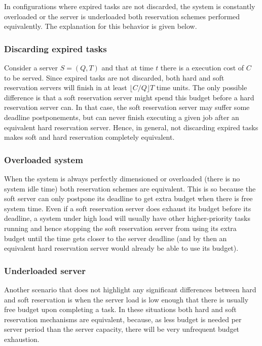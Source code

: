 \documentclass[times, 10pt,twocolumn]{article}
\begin{document}
\label{sec:noDifference}

In configurations where expired tasks are not discarded, the system is
constantly overloaded or the server is underloaded both
reservation schemes performed equivalently. The explanation for this
behavior is given below.

\subsubsection{Discarding expired tasks}
\label{sec:disc-expir-tasks}

Consider a server $S = (Q,T)$ and that at time $t$ there is a
execution cost of $C$ to be served.  Since expired tasks are not
discarded, both hard and soft reservation servers will finish in at
least $\lfloor C/Q \rfloor T$ time units.  The only possible
difference is that a soft reservation server might spend this budget
before a hard reservation server can. In that case, the soft
reservation server may suffer some deadline postponements, but can
never finish executing a given job after an equivalent hard
reservation server. Hence, in general, not discarding expired tasks
makes soft and hard reservation completely equivalent.

\subsubsection{Overloaded system}
\label{sec:system-load}

When the system is always perfectly dimensioned or overloaded (there
is no system idle time) both reservation schemes are equivalent. This
is so because the soft server can only postpone its deadline to get
extra budget when there is free system time. Even if a soft
reservation server does exhaust its budget before its deadline, a
system under high load will usually have other higher-priority tasks
running and hence stopping the soft reservation server from using its
extra budget until the time gets closer to the server deadline (and by
then an equivalent hard reservation server would already be able to
use its budget).

\subsubsection{Underloaded server}
\label{sec:server-load}

Another scenario that does not highlight any significant differences
between hard and soft reservation is when the server load is low
enough that there is usually free budget upon completing a task. In
these situations both hard and soft reservation mechanisms are
equivalent, because, as less budget is needed per server period than
the server capacity, there will be very unfrequent budget
exhaustion.
\end{document}
